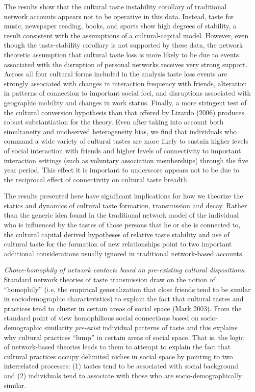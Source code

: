 The results show that the cultural taste instability corollary of traditional network accounts appears not to be operative in this data. Instead, taste for music, newspaper reading, books, and sports show high degrees of stability, a result consistent with the assumptions of a cultural-capital model. However, even though the taste-stability corollary is not supported by these data, the network theoretic assumption that cultural taste loss is more likely to be due to events associated with the disruption of personal networks receives very strong support. Across all four cultural forms included in the analysis taste loss events are strongly associated with changes in interaction frequency with friends, alteration in patterns of connection to important social foci, and disruptions associated with geographic mobility and changes in work status. Finally, a more stringent test of the cultural conversion hypothesis than that offered by Lizardo (2006) produces robust substantiation for the theory. Even after taking into account both simultaneity and unobserved heterogeneity bias, we find that individuals who command a wide variety of cultural tastes are more likely to sustain higher levels of social interaction with friends and higher levels of connectivity to important interaction settings (such as voluntary association memberships) through the five year period. This effect it is important to underscore appears not to be due to the reciprocal effect of connectivity on cultural taste breadth.

The results presented here have significant implications for how we theorize the statics and dynamics of cultural taste formation, transmission and decay. Rather than the generic idea found in the traditional network model of the individual who is influenced by the tastes of those persons that he or she is connected to, the cultural capital derived hypotheses of relative taste stability and use of cultural taste for the formation of new relationships point to two important additional considerations usually ignored in traditional network-based accounts.

\emph{Choice-homophily of network contacts based on pre-existing cultural dispositions}. Standard network theories of taste transmission draw on the notion of ``homophily'' (i.e. the empirical generalization that close friends tend to be similar in sociodemographic characteristics) to explain the fact that cultural tastes and practices tend to cluster in certain areas of social space (Mark 2003). From the standard point of view homophilious social connections based on socio-demographic similarity \emph{pre-exist} individual patterns of taste and this explains why cultural practices ``lump'' in certain areas of social space. That is, the logic of network-based theories leads to them to attempt to explain the fact that cultural practices occupy delimited niches in social space by pointing to two interrelated processes: (1) tastes tend to be associated with social background and (2) individuals tend to associate with those who are socio-demographically similar.

